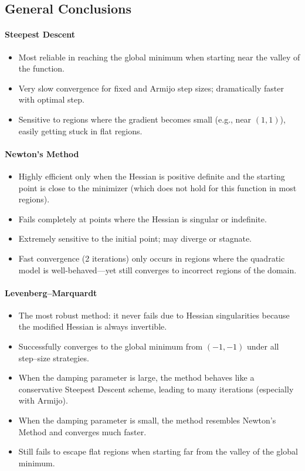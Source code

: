 \documentclass[11pt]{article}
\begin{document}
\subsection{General Conclusions}

\paragraph{Steepest Descent}
\begin{itemize}
\item Most reliable in reaching the global minimum when starting near the valley of the function.
\item Very slow convergence for fixed and Armijo step sizes; dramatically faster with optimal step.
\item Sensitive to regions where the gradient becomes small (e.g., near $(1,1)$), easily getting stuck in flat regions.
\end{itemize}

\paragraph{Newton’s Method}
\begin{itemize}
\item Highly efficient only when the Hessian is positive definite and the starting point is close to the minimizer (which does not hold for this function in most regions).
\item Fails completely at points where the Hessian is singular or indefinite.
\item Extremely sensitive to the initial point; may diverge or stagnate.
\item Fast convergence (2 iterations) only occurs in regions where the quadratic model is well-behaved—yet still converges to incorrect regions of the domain.
\end{itemize}

\paragraph{Levenberg--Marquardt}
\begin{itemize}
\item The most robust method: it never fails due to Hessian singularities because the modified Hessian is always invertible.
\item Successfully converges to the global minimum from $(-1,-1)$ under all step–size strategies.
\item When the damping parameter is large, the method behaves like a conservative Steepest Descent scheme, leading to many iterations (especially with Armijo).
\item When the damping parameter is small, the method resembles Newton's Method and converges much faster.
\item Still fails to escape flat regions when starting far from the valley of the global minimum.
\end{itemize}
\end{document}
